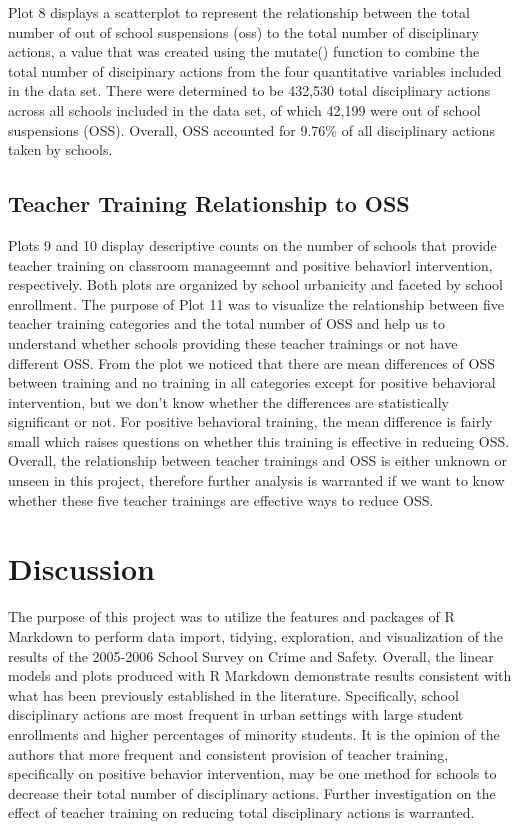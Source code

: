 \documentclass[man]{apa6}
\begin{document}
Plot 8 displays a scatterplot to represent the relationship between the total number of out of school suspensions (oss) to the total number of disciplinary actions, a value that was created using the mutate() function to combine the total number of discipinary actions from the four quantitative variables included in the data set. There were determined to be 432,530 total disciplinary actions across all schools included in the data set, of which 42,199 were out of school suspensions (OSS). Overall, OSS accounted for 9.76\% of all disciplinary actions taken by schools.

\hypertarget{teacher-training-relationship-to-oss-1}{%
\subsection{Teacher Training Relationship to OSS}\label{teacher-training-relationship-to-oss-1}}

Plots 9 and 10 display descriptive counts on the number of schools that provide teacher training on classroom manageemnt and positive behaviorl intervention, respectively. Both plots are organized by school urbanicity and faceted by school enrollment. The purpose of Plot 11 was to visualize the relationship between five teacher training categories and the total number of OSS and help us to understand whether schools providing these teacher trainings or not have different OSS. From the plot we noticed that there are mean differences of OSS between training and no training in all categories except for positive behavioral intervention, but we don't know whether the differences are statistically significant or not. For positive behavioral training, the mean difference is fairly small which raises questions on whether this training is effective in reducing OSS. Overall, the relationship between teacher trainings and OSS is either unknown or unseen in this project, therefore further analysis is warranted if we want to know whether these five teacher trainings are effective ways to reduce OSS.

\hypertarget{discussion}{%
\section{Discussion}\label{discussion}}

The purpose of this project was to utilize the features and packages of R Markdown to perform data import, tidying, exploration, and visualization of the results of the 2005-2006 School Survey on Crime and Safety. Overall, the linear models and plots produced with R Markdown demonstrate results consistent with what has been previously established in the literature. Specifically, school disciplinary actions are most frequent in urban settings with large student enrollments and higher percentages of minority students. It is the opinion of the authors that more frequent and consistent provision of teacher training, specifically on positive behavior intervention, may be one method for schools to decrease their total number of disciplinary actions. Further investigation on the effect of teacher training on reducing total disciplinary actions is warranted.
\end{document}
